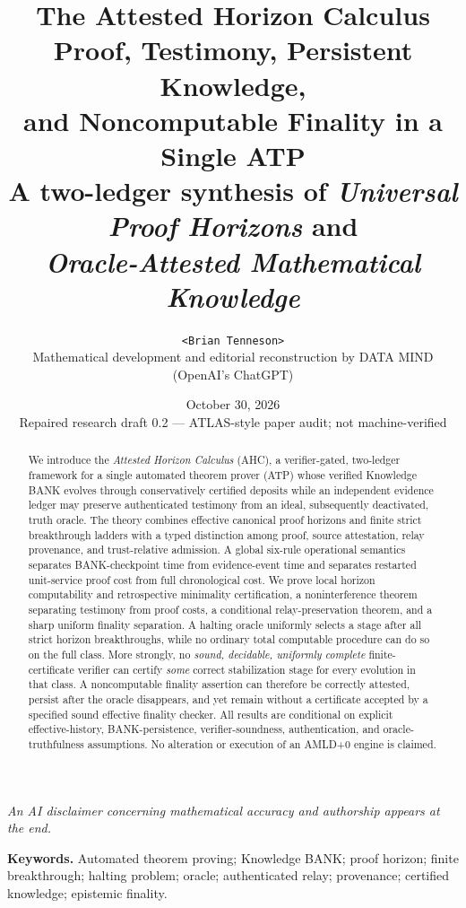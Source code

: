 \documentclass[11pt,letterpaper]{article}
\title{\bfseries\LARGE The Attested Horizon Calculus\\[5pt]
\large Proof, Testimony, Persistent Knowledge,\\ and Noncomputable Finality in a Single ATP\\[10pt]
\normalsize A two-ledger synthesis of \emph{Universal Proof Horizons} and\\\emph{Oracle-Attested Mathematical Knowledge}}
\author{\texttt{<Brian Tenneson>}\\[2pt]\small Mathematical development and editorial reconstruction by DATA MIND\\[-1pt]\small (OpenAI's ChatGPT)}
\date{October 30, 2026\\\small Repaired research draft 0.2 --- ATLAS-style paper audit; not machine-verified}
\theoremstyle{definition}
\theoremstyle{remark}
\begin{document}
\maketitle
\begin{center}\footnotesize\emph{An AI disclaimer concerning mathematical accuracy and authorship appears at the end.}\end{center}
\begin{abstract}
We introduce the \emph{Attested Horizon Calculus} (AHC), a verifier-gated, two-ledger framework for a single automated theorem prover (ATP) whose verified Knowledge BANK evolves through conservatively certified deposits while an independent evidence ledger may preserve authenticated testimony from an ideal, subsequently deactivated, truth oracle. The theory combines effective canonical proof horizons and finite strict breakthrough ladders with a typed distinction among proof, source attestation, relay provenance, and trust-relative admission. A global six-rule operational semantics separates BANK-checkpoint time from evidence-event time and separates restarted unit-service proof cost from full chronological cost. We prove local horizon computability and retrospective minimality certification, a noninterference theorem separating testimony from proof costs, a conditional relay-preservation theorem, and a sharp uniform finality separation. A halting oracle uniformly selects a stage after all strict horizon breakthroughs, while no ordinary total computable procedure can do so on the full class. More strongly, no \emph{sound, decidable, uniformly complete} finite-certificate verifier can certify \emph{some} correct stabilization stage for every evolution in that class. A noncomputable finality assertion can therefore be correctly attested, persist after the oracle disappears, and yet remain without a certificate accepted by a specified sound effective finality checker. All results are conditional on explicit effective-history, BANK-persistence, verifier-soundness, authentication, and oracle-truthfulness assumptions. No alteration or execution of an AMLD+0 engine is claimed.
\end{abstract}
\noindent\textbf{Keywords.} Automated theorem proving; Knowledge BANK; proof horizon; finite breakthrough; halting problem; oracle; authenticated relay; provenance; certified knowledge; epistemic finality.
\tableofcontents
\bigskip
\end{document}

